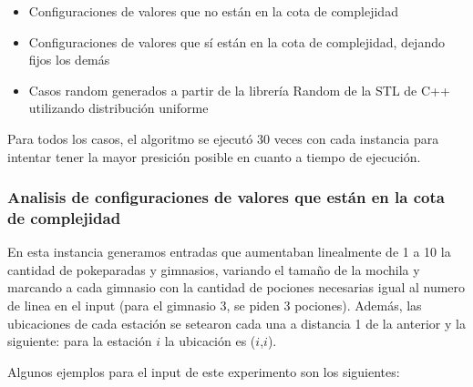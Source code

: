       \begin{itemize}
        \item Configuraciones de valores que no están en la cota de complejidad
        \item Configuraciones de valores que sí están en la cota de complejidad, dejando fijos los demás
        \item Casos random generados a partir de la librería Random de la STL de C++ utilizando distribución uniforme
      \end{itemize}

      Para todos los casos, el algoritmo se ejecutó 30 veces con cada instancia para intentar tener la mayor presición posible en cuanto a tiempo de ejecución.

      \subsubsection{Analisis de configuraciones de valores que están en la cota de complejidad}
      En esta instancia generamos entradas que aumentaban linealmente de 1 a 10 la cantidad de pokeparadas y gimnasios, variando el tamaño de la mochila y marcando a cada gimnasio con la cantidad de pociones necesarias igual al numero de linea en el input (para el gimnasio 3, se piden 3 pociones). Además, las ubicaciones de cada estación se setearon cada una a distancia 1 de la anterior y la siguiente: para la estación $i$ la ubicación es ($i$,$i$).

      Algunos ejemplos para el input de este experimento son los siguientes: